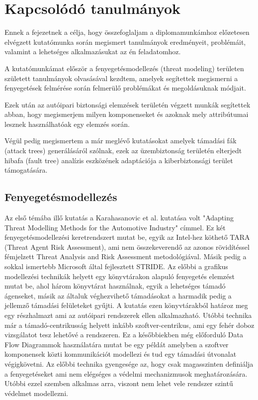 \chapter{Kapcsolódó tanulmányok}
Ennek a fejezetnek a célja, hogy összefoglaljam a diplomamunkámhoz előzetesen elvégzett kutatómunka során megismert tanulmányok eredményeit, problémáit, valamint a lehetséges alkalmazásukat az én feladatomhoz.

A kutatómunkámat először a fenyegetésmodellezés (threat modeling) területen született tanulmányok olvasásával kezdtem, amelyek segítettek megismerni a fenyegetések felmérése során felmerülő problémákat és megoldásuknak módjait.

Ezek után az autóipari biztonsági elemzések területén végzett munkák segítettek abban, hogy megismerjem milyen komponenseket és azoknak mely attribútumai lesznek használhatóak egy elemzés során.

Végül pedig megismertem a már meglévő kutatásokat amelyek támadási fák (attack trees) generálásáról szólnak, ezek az üzembiztonság területén elterjedt hibafa (fault tree) analízis eszközének adaptációja a kiberbiztonsági terület támogatására.

\section{Fenyegetésmodellezés}

Az első témába illő kutatás a Karahasanovic et al.\cite{Karahasanovic} kutatása volt "Adapting Threat Modelling Methods for the Automotive Industry" címmel. Ez két fenyegetésmodellezési keretrendszert mutat be, egyik az Intel-hez köthető TARA (Threat Agent Risk Assessment), ami nem összekeverendő az azonos rövidítéssel fémjelzett Threat Analysis and Risk Assessment metodológiával. Másik pedig a sokkal ismertebb Microsoft által fejlesztett STRIDE. Az előbbi a grafikus modellezési technikák helyett egy könyvtárakon alapuló fenyegetés elemzést mutat be, ahol három könyvtárat használnak, egyik a lehetséges támadó ágenseket, másik az általuk véghezvihető támadásokat a harmadik pedig a jellemző támadási felületeket gyűjti. A kutatás ezen könyvtárakból határoz meg egy részhalmazt ami az autóipari rendszerek ellen alkalmazható. Utóbbi technika már a támadó-centrikusság helyett inkább szoftver-centrikus, ami egy fehér doboz vizsgálatot tesz lehetővé a rendszeren. Ez a későbbiekben még előforduló Data Flow Diagrammok használatára mutat be egy példát amelyben a szoftver komponensek közti kommunikációt modellezi és tud egy támadási útvonalat végigkövetni. Az előbbi technika gyengesége az, hogy csak magasszinten definiálja a fenyegetéseket ami nem elégséges a védelmi mechanizmusok meghatározására. Utóbbi ezzel szemben alkalmas arra, viszont nem lehet vele rendszer szintű védelmet modellezni.

